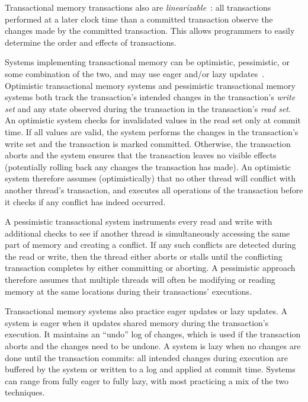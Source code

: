 Transactional memory transactions also are \emph{linearizable}~\cite{linearizability}: all transactions performed at a later clock time than a committed transaction observe the changes made by the committed transaction. This allows programmers to easily determine the order and effects of transactions.


Systems implementing transactional memory can be optimistic, pessimistic, or some combination of the two, and may use eager and/or lazy updates~\cite{harristm}. 
Optimistic transactional memory systems and pessimistic transactional memory systems both track the transaction's intended changes in the transaction's \emph{write set} and any state observed during the transaction in the transaction's \emph{read set}. 
An optimistic system checks for invalidated values in the read set only at commit time. If all values are valid, the system performs the changes in the transaction's write set and the transaction is marked committed. Otherwise, the transaction aborts and the system ensures that the transaction leaves no visible effects (potentially rolling back any changes the transaction has made). An optimistic system therefore assumes (optimistically) that no other thread will conflict with another thread's transaction, and executes all operations of the transaction before it checks if any conflict has indeed occurred.

A pessimistic transactional system instruments every read and write with additional checks to see if another thread is simultaneously accessing the same part of memory and creating a conflict. If any such conflicts are detected during the read or write, then the thread either aborts or stalls until the conflicting transaction completes by either committing or aborting. A pessimistic approach therefore assumes that multiple threads will often be modifying or reading memory at the same locations during their transactions' executions. 

Transactional memory systems also practice eager updates or lazy updates. A system is eager when it updates shared memory during the transaction's execution. It maintains an ``undo'' log of changes, which is used if the transaction aborts and the changes need to be undone. A system is lazy when no changes are done until the transaction commits: all intended changes during execution are buffered by the system or written to a log and applied at commit time. Systems can range from fully eager to fully lazy, with most practicing a mix of the two techniques.

